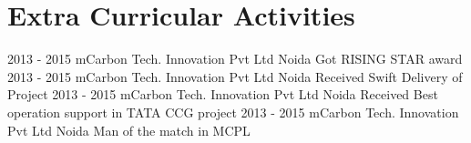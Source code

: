 \documentclass[]{cs-style} %
\begin{document}
\section{Extra Curricular Activities}
\begin{entrylist}
\entry
{2013 - 2015}
{mCarbon Tech. Innovation Pvt Ltd}
{Noida}
{Got RISING STAR award}
\entry
{2013 - 2015}
{mCarbon Tech. Innovation Pvt Ltd}
{Noida}
{Received Swift Delivery of Project}
\entry
{2013 - 2015}
{mCarbon Tech. Innovation Pvt Ltd}
{Noida}
{Received Best operation support in TATA CCG project }
\entry
{2013 - 2015}
{mCarbon Tech. Innovation Pvt Ltd}
{Noida}
{Man of the match in MCPL}
\end{entrylist}
\end{document}
